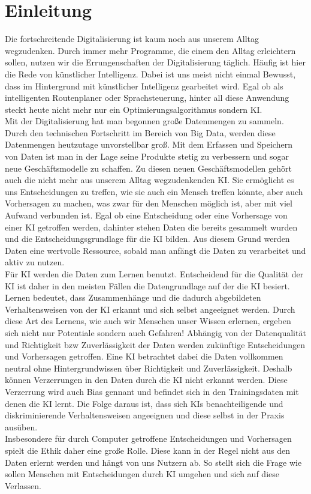 \chapter{Einleitung}
    \begin{onehalfspace}    
        \label{sec:einleitung}
        Die fortschreitende Digitalisierung ist kaum noch aus unserem Alltag wegzudenken. Durch immer mehr Programme, die einem den Alltag erleichtern sollen, nutzen wir die Errungenschaften der Digitalisierung täglich. Häufig ist hier die Rede von künstlicher Intelligenz. Dabei ist uns meist nicht einmal Bewusst, dass im Hintergrund mit künstlicher Intelligenz gearbeitet wird. Egal ob als intelligenten Routenplaner oder Sprachsteuerung, hinter all diese Anwendung steckt heute nicht mehr nur ein Optimierungsalgorithmus sondern \ac{KI}. \\
        Mit der Digitalisierung hat man begonnen große Datenmengen zu sammeln. Durch den technischen Fortschritt im Bereich von Big Data, werden diese Datenmengen heutzutage unvorstellbar groß. Mit dem Erfassen und Speichern von Daten ist man in der Lage seine Produkte stetig zu verbessern und sogar neue Geschäftsmodelle zu schaffen. Zu diesen neuen Geschäftsmodellen gehört auch die nicht mehr aus unserem Alltag wegzudenkenden \ac{KI}. Sie ermöglicht es uns Entscheidungen zu treffen, wie sie auch ein Mensch treffen könnte, aber auch Vorhersagen zu machen, was zwar für den Menschen möglich ist, aber mit viel Aufwand verbunden ist. Egal ob eine Entscheidung oder eine Vorhersage von einer \ac{KI} getroffen werden, dahinter stehen Daten die bereits gesammelt wurden und die Entscheidungsgrundlage für die \ac*{KI} bilden. Aus diesem Grund werden Daten eine wertvolle Ressource, sobald man anfängt die Daten zu verarbeitet und aktiv zu nutzen. \\
        Für \ac*{KI} werden die Daten zum Lernen benutzt. Entscheidend für die Qualität der \ac*{KI} ist daher in den meisten Fällen die Datengrundlage auf der die \ac*{KI} besiert. Lernen bedeutet, dass Zusammenhänge und die dadurch abgebildeten Verhaltensweisen von der \ac*{KI} erkannt und sich selbst angeeignet werden. Durch diese Art des Lernens, wie auch wir Menschen unser Wissen erlernen, ergeben sich nicht nur Potentiale sondern auch Gefahren! Abhängig von der Datenqualität und Richtigkeit \ac*{bzw} Zuverlässigkeit der Daten werden zukünftige Entscheidungen und Vorhersagen getroffen. Eine \ac*{KI} betrachtet dabei die Daten vollkommen neutral ohne Hintergrundwissen über Richtigkeit und Zuverlässigkeit. Deshalb können Verzerrungen in den Daten durch die \ac*{KI} nicht erkannt werden. Diese Verzerrung wird auch Bias gennant und befindet sich in den Trainingsdaten mit denen die \ac*{KI} lernt. Die Folge daraus ist, dass sich \ac*{KI}s benachteiligende und diskriminierende Verhaltensweisen angeeignen und diese selbst in der Praxis ausüben.\\
        Insbesondere für durch Computer getroffene Entscheidungen und Vorhersagen spielt die Ethik daher eine große Rolle. Diese kann in der Regel nicht aus den Daten erlernt werden und hängt von uns Nutzern ab. So stellt sich die Frage wie sollen Menschen mit Entscheidungen durch \ac*{KI} umgehen und sich auf diese Verlassen.
        

\end{onehalfspace}

